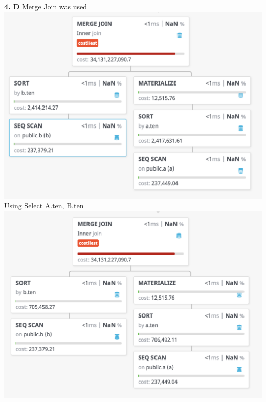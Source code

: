 \documentclass[12pt, letterpaper, fleqn]{article}
\begin{document}
  \textbf{4. D}
  Merge Join was used\\
  \includegraphics[scale=0.5]{query_pics/4.png} \\
  Using Select A.ten, B.ten\\
  \includegraphics[scale=0.5]{query_pics/4b.png} \\\\
\end{document}
